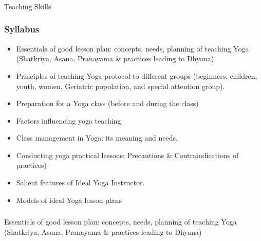 \begin{frame}[fragile]\frametitle{}
\begin{center}
{\Large Teaching Skills }
\end{center}
\end{frame}

\begin{frame}[fragile]\frametitle{Syllabus}

\begin{itemize}
\item  Essentials  of  good  lesson  plan:  concepts,  needs,  planning  of  teaching  Yoga  (Shatkriya, Asana, Pranayama \& practices leading to Dhyana) 
\item  Principles  of  teaching  Yoga  protocol  to  different  groups  (beginners,  children,  youth, women, Geriatric population, and special attention group). 
\item  Preparation for a Yoga class (before and during the class) 
\item  Factors influencing yoga teaching. 
\item  Class management in Yoga: its meaning and needs. 
\item  Conducting yoga practical lessons: Precautions \& Contraindications of practices)  
\item  Salient features of Ideal Yoga Instructor.  
\item  Models of ideal Yoga lesson plans 
\end{itemize}
\end{frame}

\begin{frame}[fragile]\frametitle{}
\begin{center}
{\Large Essentials  of  good  lesson  plan:  concepts,  needs,  planning  of  teaching  Yoga  (Shatkriya, Asana, Pranayama \& practices leading to Dhyana) }
\end{center}
\end{frame}

